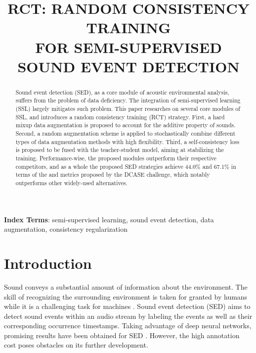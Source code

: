 \documentclass[a4paper]{article}
\title{RCT: RANDOM CONSISTENCY TRAINING \\ FOR SEMI-SUPERVISED SOUND EVENT DETECTION}
\begin{document}
\maketitle
\begin{abstract}
  Sound event detection (SED), as a core module of acoustic environmental analysis, suffers from the problem of data deficiency. The integration of semi-supervised learning (SSL) largely mitigates such problem. This paper researches on several core modules of SSL, and introduces a random consistency training (RCT) strategy. First, a hard mixup data augmentation is proposed to account for the additive property of sounds. Second, a random augmentation scheme is applied to stochastically combine different types of data augmentation methods with high flexibility. Third, a self-consistency loss is proposed to be fused with the teacher-student model, aiming at stabilizing the training. Performance-wise, the proposed modules outperform their respective competitors, and as a whole the proposed SED strategies achieve 44.0\% and 67.1\% in terms of the  and  metrics proposed by the DCASE challenge, which notably outperforms other widely-used alternatives.
\end{abstract}
\noindent\textbf{Index Terms}: semi-supervised learning, sound event detection, data augmentation, consistency regularization

\section{Introduction}
\label{sec:intro}

Sound conveys a substantial amount of information about the environment. The skill of recognizing the surrounding environment is taken for granted by humans while it is a challenging task for machines \cite{virtanen2018computational}. Sound event detection (SED) aims to detect sound events within an audio stream by labeling the events as well as their corresponding occurrence timestamps. Taking advantage of deep neural networks, promising results have been obtained for SED \cite{turpault2019sound}. However, the high annotation cost poses obstacles on its further development. 
\end{document}
